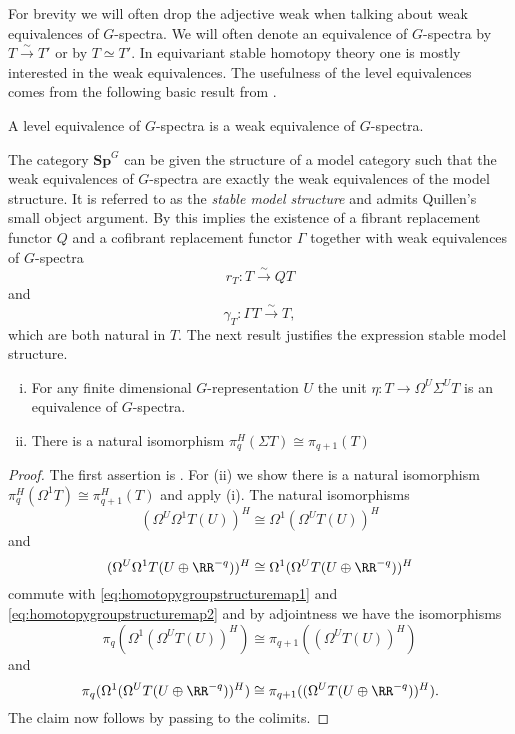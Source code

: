 For brevity we will often drop the adjective weak when
talking about weak equivalences of $G$-spectra.
We will often denote an equivalence of $G$-spectra by
$T\xrightarrow{\sim} T'$ or by $T\simeq T'$. In equivariant
stable homotopy theory one is mostly interested in the weak
equivalences. The usefulness of the level equivalences comes
from the following basic result from \cite[Lemma~III.3.3, \pno~45]{mandellmay}.
\begin{lem}
A level equivalence of $G$-spectra is a weak equivalence of $G$-spectra.
\end{lem}

The category $\mathbf{Sp}^G$ can be given the structure of a model
category \cite[Theorem~III.4.2, \pno~47]{mandellmay} such that the weak equivalences
of $G$-spectra are exactly the weak equivalences of the model structure. 
It is referred to as the \textit{stable model structure}
and admits Quillen's
small object argument. By \cite[Theorem~2.1.14, \pno~33]{hoveymodelcats} 
this implies the existence of a fibrant replacement 
functor $Q$ and a cofibrant replacement functor $\Gamma$
together with weak equivalences of $G$-spectra
\[
r_T: T\xrightarrow{\sim} QT
\]
and
\[
\gamma_T:\Gamma T\xrightarrow{\sim} T,
\]
which are both natural in $T$. The next result justifies the expression
stable model structure.


\begin{lem}\label{lem:spectrumsuspensionshift}
\begin{enumerate}[(i)]
\item For any finite dimensional $G$-representation $U$
the unit $\eta:T\to \Omega^U\Sigma^UT$ is an equivalence
of $G$-spectra.
\item There is a natural isomorphism $\pi^H_q(\Sigma T)\cong \pi_{q+1}(T)$
\end{enumerate}
\end{lem}
\begin{proof}
The first assertion is \cite[Lemma~3.8, \pno~46]{mandellmay}. For (ii)
we show there is a natural isomorphism $\pi_q^H(\Omega^1 T)\cong \pi_{q+1}^H(T)$
and apply (i). The natural isomorphisms 
\[
(\Omega^U\Omega^1T(U))^H\cong\Omega^1(\Omega^UT(U))^H
\]
and 
\[
(\Omega^U\Omega^1T(U\oplus \RR^{-q}))^H\cong\Omega^1(\Omega^UT(U\oplus\RR^{-q}))^H
\]
commute with \eqref{eq:homotopygroupstructuremap1} and  \eqref{eq:homotopygroupstructuremap2} 
and by adjointness we have the isomorphisms
\[
\pi_q(\Omega^1(\Omega^UT(U))^H)\cong \pi_{q+1}((\Omega^UT(U))^H)
\]
and
\[
\pi_q(\Omega^1(\Omega^UT(U\oplus\RR^{-q}))^H)\cong \pi_{q+1}((\Omega^UT(U\oplus\RR^{-q}))^H).
\]
The claim now follows by passing to the colimits.
\end{proof}

